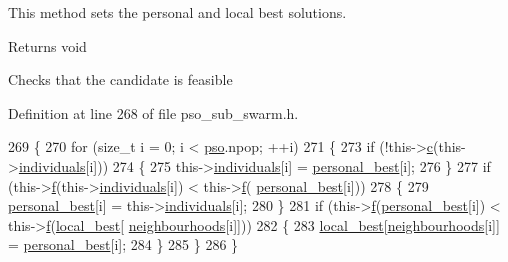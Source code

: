 This method sets the personal and local best solutions. 

\begin{DoxyReturn}{Returns}
void 
\end{DoxyReturn}
Checks that the candidate is feasible 

Definition at line 268 of file pso\+\_\+sub\+\_\+swarm.\+h.


\begin{DoxyCode}
269     \{
270         \textcolor{keywordflow}{for} (\textcolor{keywordtype}{size\_t} i = 0; i < \hyperlink{classea_1_1_solver_3_01_p_s_os_00_01_t_00_01_f_00_01_c_01_4_a1f1aa62756a73565ebe0ca1fbc084ea5}{pso}.npop; ++i)
271         \{
273             \textcolor{keywordflow}{if} (!this->\hyperlink{classea_1_1_solver__base_a6914e89d30e7484f2b4af1783f0de8c3}{c}(this->\hyperlink{classea_1_1_solver__base_ad75bc440d24a46e97694c7c889f2ecde}{individuals}[i]))
274             \{
275                 this->\hyperlink{classea_1_1_solver__base_ad75bc440d24a46e97694c7c889f2ecde}{individuals}[i] = \hyperlink{classea_1_1_solver_3_01_p_s_os_00_01_t_00_01_f_00_01_c_01_4_a8a857e38363bd1ed23ea77e262b9b710}{personal\_best}[i];
276             \}
277             \textcolor{keywordflow}{if} (this->\hyperlink{classea_1_1_solver__base_ae0a893780c93dfe17c1d17301de6494f}{f}(this->\hyperlink{classea_1_1_solver__base_ad75bc440d24a46e97694c7c889f2ecde}{individuals}[i]) < this->\hyperlink{classea_1_1_solver__base_ae0a893780c93dfe17c1d17301de6494f}{f}(
      \hyperlink{classea_1_1_solver_3_01_p_s_os_00_01_t_00_01_f_00_01_c_01_4_a8a857e38363bd1ed23ea77e262b9b710}{personal\_best}[i]))
278             \{
279                 \hyperlink{classea_1_1_solver_3_01_p_s_os_00_01_t_00_01_f_00_01_c_01_4_a8a857e38363bd1ed23ea77e262b9b710}{personal\_best}[i] = this->\hyperlink{classea_1_1_solver__base_ad75bc440d24a46e97694c7c889f2ecde}{individuals}[i];
280             \}
281             \textcolor{keywordflow}{if} (this->\hyperlink{classea_1_1_solver__base_ae0a893780c93dfe17c1d17301de6494f}{f}(\hyperlink{classea_1_1_solver_3_01_p_s_os_00_01_t_00_01_f_00_01_c_01_4_a8a857e38363bd1ed23ea77e262b9b710}{personal\_best}[i]) < this->\hyperlink{classea_1_1_solver__base_ae0a893780c93dfe17c1d17301de6494f}{f}(\hyperlink{classea_1_1_solver_3_01_p_s_os_00_01_t_00_01_f_00_01_c_01_4_afa2eb13f0e5028ba4aa96f7e29b62e9c}{local\_best}[
      \hyperlink{classea_1_1_solver_3_01_p_s_os_00_01_t_00_01_f_00_01_c_01_4_a192926bdbed79d0cd68867c4f695cd92}{neighbourhoods}[i]]))
282             \{
283                 \hyperlink{classea_1_1_solver_3_01_p_s_os_00_01_t_00_01_f_00_01_c_01_4_afa2eb13f0e5028ba4aa96f7e29b62e9c}{local\_best}[\hyperlink{classea_1_1_solver_3_01_p_s_os_00_01_t_00_01_f_00_01_c_01_4_a192926bdbed79d0cd68867c4f695cd92}{neighbourhoods}[i]] = 
      \hyperlink{classea_1_1_solver_3_01_p_s_os_00_01_t_00_01_f_00_01_c_01_4_a8a857e38363bd1ed23ea77e262b9b710}{personal\_best}[i];
284             \}
285         \}
286     \}
\end{DoxyCode}
